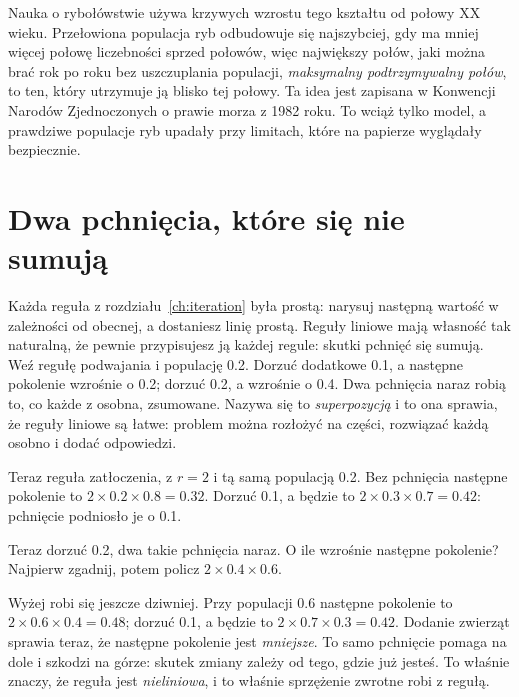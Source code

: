 
\begin{worldbox}
Nauka o rybołówstwie używa krzywych wzrostu tego kształtu od połowy XX
wieku. Przełowiona populacja ryb odbudowuje się najszybciej, gdy ma mniej
więcej połowę liczebności sprzed połowów, więc największy połów, jaki można
brać rok po roku bez uszczuplania populacji, \emph{maksymalny podtrzymywalny
połów}, to ten, który utrzymuje ją blisko tej połowy. Ta idea jest zapisana
w Konwencji Narodów Zjednoczonych o prawie morza z 1982 roku. To wciąż
tylko model, a prawdziwe populacje ryb upadały przy limitach, które na
papierze wyglądały bezpiecznie.
\end{worldbox}

\section{Dwa pchnięcia, które się nie sumują}
\label{sec:ch03-superposition}

\noindent
Każda reguła z rozdziału~\ref{ch:iteration} była prostą: narysuj następną
wartość w zależności od obecnej, a dostaniesz linię prostą. Reguły
liniowe mają własność tak naturalną, że pewnie przypisujesz ją każdej
regule: skutki pchnięć się sumują. Weź regułę podwajania i populację
\num{0.2}. Dorzuć dodatkowe \num{0.1}, a następne pokolenie wzrośnie o
\num{0.2}; dorzuć \num{0.2}, a wzrośnie o \num{0.4}. Dwa pchnięcia naraz
robią to, co każde z osobna, zsumowane. Nazywa się to \emph{superpozycją} i
to ona sprawia, że reguły liniowe są łatwe: problem można rozłożyć na
części, rozwiązać każdą osobno i dodać odpowiedzi.

Teraz reguła zatłoczenia, z $r = 2$ i tą samą populacją \num{0.2}. Bez
pchnięcia następne pokolenie to $2 \times \num{0.2} \times \num{0.8} =
\num{0.32}$. Dorzuć \num{0.1}, a będzie to $2 \times \num{0.3} \times
\num{0.7} = \num{0.42}$: pchnięcie podniosło je o \num{0.1}.

\begin{think}
Teraz dorzuć \num{0.2}, dwa takie pchnięcia naraz. O ile wzrośnie następne
pokolenie? Najpierw zgadnij, potem policz $2 \times \num{0.4} \times
\num{0.6}$.
\end{think}
Wyżej robi się jeszcze dziwniej. Przy populacji \num{0.6} następne pokolenie
to $2 \times \num{0.6} \times \num{0.4} = \num{0.48}$; dorzuć \num{0.1}, a
będzie to $2 \times \num{0.7} \times \num{0.3} = \num{0.42}$. Dodanie zwierząt
sprawia teraz, że następne pokolenie jest \emph{mniejsze}. To samo pchnięcie
pomaga na dole i szkodzi na górze: skutek zmiany zależy od tego, gdzie już
jesteś. To właśnie znaczy, że reguła jest \emph{nieliniowa}, i to właśnie
sprzężenie zwrotne robi z regułą.

